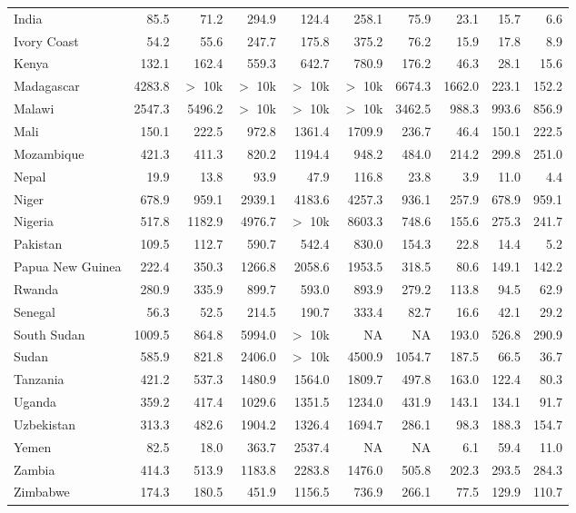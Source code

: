 \begin{table}[b]
{\begin{tabular}[t]{lrrrrrrrrr}
India & 85.5 & 71.2 & 294.9 & 124.4 & 258.1 & 75.9 & 23.1 & 15.7 & 6.6\\
Ivory Coast & 54.2 & 55.6 & 247.7 & 175.8 & 375.2 & 76.2 & 15.9 & 17.8 & 8.9\\
Kenya & 132.1 & 162.4 & 559.3 & 642.7 & 780.9 & 176.2 & 46.3 & 28.1 & 15.6\\
Madagascar & 4283.8 & $>$ 10k & $>$ 10k & $>$ 10k & $>$ 10k & 6674.3 & 1662.0 & 223.1 & 152.2\\
Malawi & 2547.3 & 5496.2 & $>$ 10k & $>$ 10k & $>$ 10k & 3462.5 & 988.3 & 993.6 & 856.9\\
Mali & 150.1 & 222.5 & 972.8 & 1361.4 & 1709.9 & 236.7 & 46.4 & 150.1 & 222.5\\
Mozambique & 421.3 & 411.3 & 820.2 & 1194.4 & 948.2 & 484.0 & 214.2 & 299.8 & 251.0\\
Nepal & 19.9 & 13.8 & 93.9 & 47.9 & 116.8 & 23.8 & 3.9 & 11.0 & 4.4\\
Niger & 678.9 & 959.1 & 2939.1 & 4183.6 & 4257.3 & 936.1 & 257.9 & 678.9 & 959.1\\
Nigeria & 517.8 & 1182.9 & 4976.7 & $>$ 10k & 8603.3 & 748.6 & 155.6 & 275.3 & 241.7\\
Pakistan & 109.5 & 112.7 & 590.7 & 542.4 & 830.0 & 154.3 & 22.8 & 14.4 & 5.2\\
Papua New Guinea & 222.4 & 350.3 & 1266.8 & 2058.6 & 1953.5 & 318.5 & 80.6 & 149.1 & 142.2\\
Rwanda & 280.9 & 335.9 & 899.7 & 593.0 & 893.9 & 279.2 & 113.8 & 94.5 & 62.9\\
Senegal & 56.3 & 52.5 & 214.5 & 190.7 & 333.4 & 82.7 & 16.6 & 42.1 & 29.2\\
South Sudan & 1009.5 & 864.8 & 5994.0 & $>$ 10k & NA & NA & 193.0 & 526.8 & 290.9\\
Sudan & 585.9 & 821.8 & 2406.0 & $>$ 10k & 4500.9 & 1054.7 & 187.5 & 66.5 & 36.7\\
Tanzania & 421.2 & 537.3 & 1480.9 & 1564.0 & 1809.7 & 497.8 & 163.0 & 122.4 & 80.3\\
Uganda & 359.2 & 417.4 & 1029.6 & 1351.5 & 1234.0 & 431.9 & 143.1 & 134.1 & 91.7\\
Uzbekistan & 313.3 & 482.6 & 1904.2 & 1326.4 & 1694.7 & 286.1 & 98.3 & 188.3 & 154.7\\
Yemen & 82.5 & 18.0 & 363.7 & 2537.4 & NA & NA & 6.1 & 59.4 & 11.0\\
Zambia & 414.3 & 513.9 & 1183.8 & 2283.8 & 1476.0 & 505.8 & 202.3 & 293.5 & 284.3\\
Zimbabwe & 174.3 & 180.5 & 451.9 & 1156.5 & 736.9 & 266.1 & 77.5 & 129.9 & 110.7\\
\bottomrule
\end{tabular}}
\end{table}
